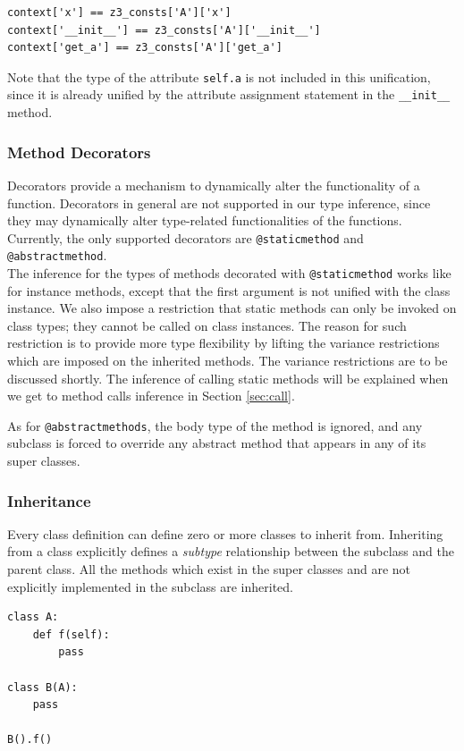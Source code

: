 \begin{lstlisting}
context['x'] == z3_consts['A']['x']
context['__init__'] == z3_consts['A']['__init__']
context['get_a'] == z3_consts['A']['get_a']
\end{lstlisting}
Note that the type of the attribute \lstinline|self.a| is not included in this unification, since it is already unified by the attribute assignment statement in the \lstinline|__init__| method.

\subsubsection{Method Decorators}
Decorators provide a mechanism to dynamically alter the functionality of a function. Decorators in general are not supported in our type inference, since they may dynamically alter type-related functionalities of the functions. Currently, the only supported decorators are \lstinline|@staticmethod| and \lstinline|@abstractmethod|. \\

The inference for the types of methods decorated with \lstinline|@staticmethod| works like for instance methods, except that the first argument is not unified with the class instance. We also impose a restriction that static methods can only be invoked on class types; they cannot be called on class instances. The reason for such restriction is to provide more type flexibility by lifting the variance restrictions which are imposed on the inherited methods. The variance restrictions are to be discussed shortly. The inference of calling static methods will be explained when we get to method calls inference in Section \ref{sec:call}.

As for \lstinline|@abstractmethods|, the body type of the method is ignored, and any subclass is forced to override any abstract method that appears in any of its super classes.

\subsubsection{Inheritance}
Every class definition can define zero or more classes to inherit from. Inheriting from a class explicitly defines a \textit{subtype} relationship between the subclass and the parent class. All the methods which exist in the super classes and are not explicitly implemented in the subclass are inherited.
\begin{lstlisting}
class A:
	def f(self):
		pass

class B(A):
	pass
	
B().f()
\end{lstlisting}

